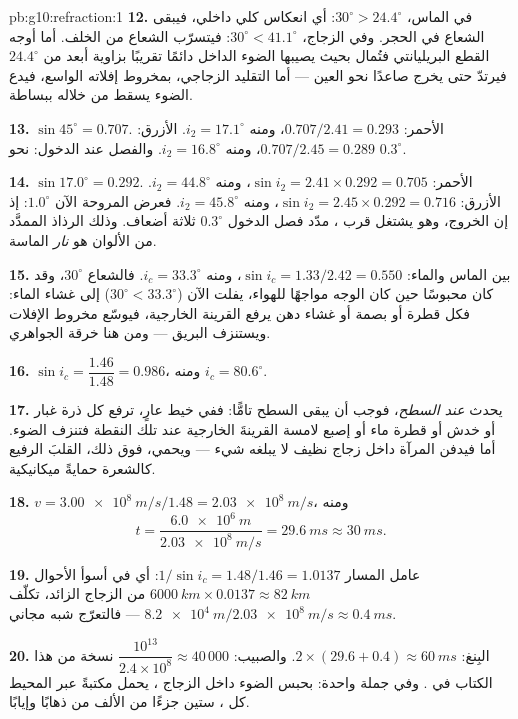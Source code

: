\begin{solution}{pb:g10:refraction:1}
\textbf{12.} في الماس، $30^\circ > 24.4^\circ$: أي انعكاس كلي
داخلي، فيبقى الشعاع في الحجر. وفي الزجاج،
$30^\circ < 41.1^\circ$: فيتسرّب الشعاع من الخلف. أما أوجه
القطع البريليانتي فتُمال بحيث يصيبها الضوء الداخل دائمًا تقريبًا
بزاوية أبعد من $24.4^\circ$ فيرتدّ حتى يخرج صاعدًا نحو
العين --- أما التقليد الزجاجي، بمخروط إفلاته الواسع، فيدع الضوء
يسقط من خلاله ببساطة.

\textbf{13.} $\sin 45^\circ = 0.707$. الأحمر: $0.707/2.41 = 0.293$، ومنه
$i_2 = 17.1^\circ$. الأزرق: $0.707/2.45 = 0.289$، ومنه $i_2 = 16.8^\circ$.
والفصل عند الدخول: نحو $0.3^\circ$.

\textbf{14.} $\sin 17.0^\circ = 0.292$. الأحمر: $\sin i_2 = 2.41 \times
0.292 = 0.705$، ومنه $i_2 = 44.8^\circ$. الأزرق: $\sin i_2 = 2.45 \times
0.292 = 0.716$، ومنه $i_2 = 45.8^\circ$. فعرض المروحة الآن $1.0^\circ$:
إذ إن  الخروج، وهو يشتغل قرب ، مدّد
فصل الدخول $0.3^\circ$ ثلاثة أضعاف. وذلك الرذاذ الممدَّد من الألوان
هو \emph{نار} الماسة.

\textbf{15.} بين الماس والماء: $\sin i_c = 1.33/2.42 = 0.550$، ومنه
$i_c = 33.3^\circ$. فالشعاع $30^\circ$، وقد كان محبوسًا حين كان الوجه مواجهًا
للهواء، يفلت الآن ($30^\circ < 33.3^\circ$) إلى غشاء الماء: فكل
قطرة أو بصمة أو غشاء دهن يرفع القرينة الخارجية، فيوسّع
مخروط الإفلات ويستنزف البريق --- ومن هنا خرقة الجواهري.

\textbf{16.} $\sin i_c = \dfrac{1.46}{1.48} = 0.986$، ومنه
$i_c = 80.6^\circ$.

\textbf{17.} يحدث  \emph{عند السطح}،
فوجب أن يبقى السطح تامًّا: ففي خيط عارٍ، ترفع كل ذرة
غبار أو خدش أو قطرة ماء أو إصبع لامسة القرينةَ الخارجية
عند تلك النقطة فتنزف الضوء. أما  فيدفن المرآة
داخل زجاج نظيف لا يبلغه شيء --- ويحمي، فوق ذلك،
القلبَ الرفيع كالشعرة حمايةً ميكانيكية.

\textbf{18.} $v = \qty{3.00e8}{m/s}/1.48 = \qty{2.03e8}{m/s}$، ومنه
\[
t = \frac{\qty{6.0e6}{m}}{\qty{2.03e8}{m/s}} = \qty{29.6}{ms} \approx
\qty{30}{ms}.
\]

\textbf{19.} عامل المسار $1/\sin i_c = 1.48/1.46 = 1.0137$: أي في أسوأ الأحوال
$\qty{6000}{km} \times 0.0137 \approx \qty{82}{km}$ من الزجاج الزائد،
تكلّف $\qty{8.2e4}{m} / \qty{2.03e8}{m/s} \approx \qty{0.4}{ms}$ ---
فالتعرّج شبه مجاني.

\textbf{20.} البِنغ: $2 \times (29.6 + 0.4) \approx \qty{60}{ms}$.
والصبيب: $\dfrac{10^{13}}{2.4 \times 10^8} \approx 40\,000$ نسخة
من هذا الكتاب في . وفي جملة واحدة: بحبس الضوء داخل
الزجاج ، يحمل  مكتبةً
عبر المحيط كل ، ستين جزءًا من الألف من  ذهابًا وإيابًا.
\end{solution}
